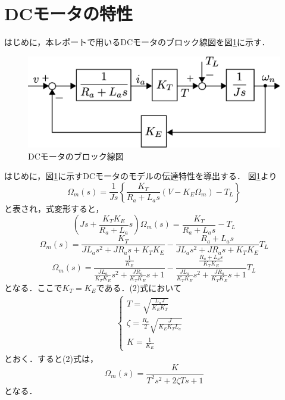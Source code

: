 \documentclass[a4paper,12pt]{jarticle}
\begin{document}
\section{DCモータの特性}
はじめに，本レポートで用いるDCモータのブロック線図を図\ref{fig:DC_model}に示す．
%
\begin{figure}[bp]
 \begin{center}
  \includegraphics[width = 150mm]{fig/DC_model.eps}
 \end{center}
 \caption{DCモータのブロック線図}
 \label{fig:DC_model}
\end{figure}
%
\newpage
%
はじめに，図\ref{fig:DC_model}に示すDCモータのモデルの伝達特性を導出する．
図\ref{fig:DC_model}より
%
\begin{equation}
 \Omega_m(s)=\frac{1}{Js}\left\{\frac{K_T}{R_{a}+L_{a}s}(V-K_E\Omega_m)-T_L\right\}
\end{equation}
と表され，式変形すると，
\begin{equation*}
 \left(Js+\frac{K_{T}K_{E}}{R_{a}+L_{a}}s\right)\Omega_m(s)=\frac{K_{T}}{R_{a}+L_{a}s}-T_L
\end{equation*}
%
\begin{equation*}
 \Omega_m(s)=\frac{K_T}{JL_{a}s^2+JR_{a}s+K_TK_E}-\frac{R_{a}+L_{a}s}{JL_{a}s^2+JR_{a}s+K_TK_E}T_L
\end{equation*}
%
\begin{equation}
 \Omega_m(s)=\frac{\frac{1}{K_E}}{\frac{JL_a}{K_{T}K_E}s^2+\frac{JR_a}{K_{T}K_E}s+1}-\frac{\frac{R_{a}+L_{a}s}{K_{T}K_E}}{\frac{JL_a}{K_{T}K_E}s^2+\frac{JR_a}{K_{T}K_E}s+1}T_L
\end{equation}
%
となる．ここで$K_T=K_E$である．(2)式において
\begin{eqnarray}
 \begin{cases}
  T = \sqrt{\frac{L_{a}J}{K_{E}K_T}} & \\
  \zeta= \frac{R_a}{2}\sqrt{\frac{J}{K_{E}K_{T}L_a}} & \\
  K = \frac{1}{K_E}
 \end{cases}
\end{eqnarray}
とおく．すると(2)式は，
\begin{equation}
 \Omega_m(s)=\frac{K}{T^2s^2+2\zeta Ts+1}
\end{equation}
となる．
\end{document}
